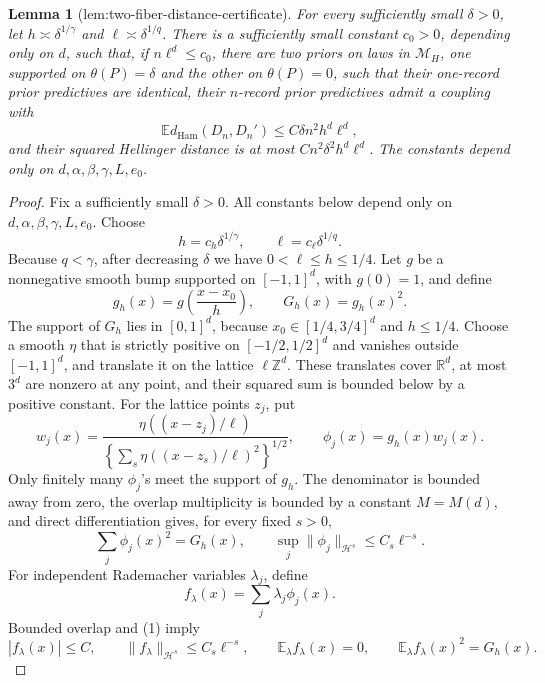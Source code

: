 \documentclass{article}
\newtheorem{lemma}{Lemma}
\begin{document}
\begin{lemma}[lem:two-fiber-distance-certificate]\label{lem:two-fiber-distance-certificate}
For every sufficiently small \(\delta>0\), let
\(h\asymp\delta^{1/\gamma}\) and
\(\ell\asymp\delta^{1/q}\).  There is a sufficiently small constant
\(c_0>0\), depending only on \(d\), such that, if \(n\ell^d\le c_0\),
there are two priors on
laws in \(\mathcal M_H\), one supported on \(\theta(P)=\delta\) and the
other on \(\theta(P)=0\), such that their one-record prior predictives are
identical, their \(n\)-record prior predictives admit a coupling with
\[
 \mathbb E d_{\mathrm{Ham}}(D_n,D_n')
 \le C\delta n^2h^d\ell^d,
\]
and their squared Hellinger distance is at most
\(C n^2\delta^2h^d\ell^d\).  The constants depend only on
\(d,\alpha,\beta,\gamma,L,e_0\).
\end{lemma}
\begin{proof}
Fix a sufficiently small \(\delta>0\).  All constants below depend only on \(d,\alpha,\beta,\gamma,L,e_0\).  Choose
\[
 h=c_h\delta^{1/\gamma},\qquad \ell=c_\ell\delta^{1/q}.
\]
Because \(q<\gamma\), after decreasing \(\delta\) we have \(0<\ell\le h\le1/4\).  Let \(g\) be a nonnegative smooth bump supported on \([-1,1]^d\), with \(g(0)=1\), and define
\[
 g_h(x)=g\!\left(\frac{x-x_0}{h}\right),\qquad G_h(x)=g_h(x)^2.
\]
The support of \(G_h\) lies in \([0,1]^d\), because \(x_0\in[1/4,3/4]^d\) and \(h\le1/4\).  Choose a smooth \(\eta\) that is strictly positive on \([-1/2,1/2]^d\) and vanishes outside \([-1,1]^d\), and translate it on the lattice \(\ell\mathbb Z^d\).  These translates cover \(\mathbb R^d\), at most \(3^d\) are nonzero at any point, and their squared sum is bounded below by a positive constant.  For the lattice points \(z_j\), put
\[
 w_j(x)=\frac{\eta((x-z_j)/\ell)}{\left\{\sum_s\eta((x-z_s)/\ell)^2\right\}^{1/2}},
 \qquad \phi_j(x)=g_h(x)w_j(x).
\]
Only finitely many \(\phi_j\)'s meet the support of \(g_h\).  The denominator is bounded away from zero, the overlap multiplicity is bounded by a constant \(M=M(d)\), and direct differentiation gives, for every fixed \(s>0\),
\[
 \sum_j\phi_j(x)^2=G_h(x),\qquad
 \sup_j\|\phi_j\|_{\mathcal H^s}\le C_s\ell^{-s}.
 \tag{1}
\]
For independent Rademacher variables \(\lambda_j\), define
\[
 f_\lambda(x)=\sum_j\lambda_j\phi_j(x).
\]
Bounded overlap and (1) imply
\[
 |f_\lambda(x)|\le C,\qquad
 \|f_\lambda\|_{\mathcal H^s}\le C_s\ell^{-s},\qquad
 \mathbb E_\lambda f_\lambda(x)=0,\qquad
 \mathbb E_\lambda f_\lambda(x)^2=G_h(x).
 \tag{2}
\]


\end{proof}
\end{document}
